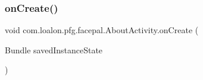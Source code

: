 \subsubsection{\texorpdfstring{on\+Create()}{onCreate()}}
{\footnotesize\ttfamily void com.\+loalon.\+pfg.\+facepal.\+About\+Activity.\+on\+Create (\begin{DoxyParamCaption}\item[{Bundle}]{saved\+Instance\+State }\end{DoxyParamCaption})\hspace{0.3cm}{\ttfamily [protected]}}

